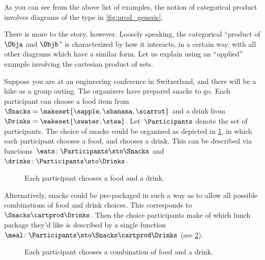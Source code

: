 As you can see from the above list of examples, the notion of categorical product involves diagrams of the type in \cref{fig:prod_generic}.

There is more to the story, however.
Loosely speaking, the categorical ``product of $\Obja$ and $\Objb$'' is characterized by how it interacts, in a certain way, with all other diagrams which have a similar form.
Let us explain using an ``applied'' example involving the cartesian product of sets.

Suppose you are at an engineering conference in Switzerland, and there will be a hike as a group outing.
The organizers have prepared snacks to go.
Each participant can choose a food item from~$\Snacks=\makeset{\sapple,\sbanana,\scarrot}$ and a drink from~$\Drinks=\makeset{\swater,\stea}$.
Let~$\Participants$ denote the set of participants.
The choice of snacks could be organized as depicted in \cref{fig:snacks_1}, in which each participant chooses a food, and chooses a drink.
This can be described via functions~$\eats \colon \Participants \sto \Snacks$ and~$\drinks \colon  \Participants \sto \Drinks$.

\begin{figure}[h!]
    \centering
    \caption{Each participant chooses a food and a drink.}
    \label{fig:snacks_1}
\end{figure}

Alternatively, snacks could be pre-packaged in such a way as to allow all possible combinations of food and drink choices.
This corresponds to~$\Snacks\cartprod \Drinks$.
Then the choice participants make of which lunch package they'd like is described by a single function~$\meal \colon \Participants\sto \Snacks\cartprod \Drinks$ (see \cref{fig:snacks_2}).

\begin{figure}[h!]
    \centering
    \caption{Each participant chooses a combination of food and a drink. \label{fig:snacks_2}}
\end{figure}

